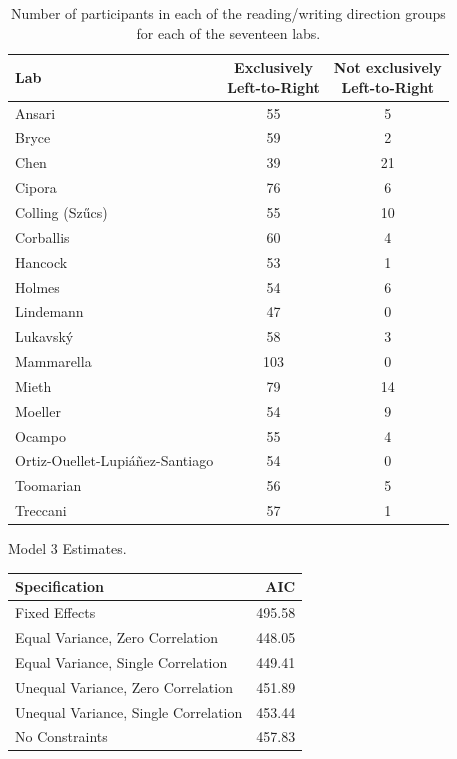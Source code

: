\documentclass[A4paper,man,floatsintext]{apa6}
\theoremstyle{definition}
\theoremstyle{definition}
\theoremstyle{definition}
\theoremstyle{remark}
\begin{document}
\begin{appendix}
\begin{table}

\caption{\label{tab:read}Number of participants in each of the reading/writing direction groups for each of the seventeen labs.}
\centering
\begin{tabular}[t]{lcc}
\toprule
Lab & \makecell[c]{Exclusively\\Left-to-Right} & \makecell[c]{Not exclusively\\Left-to-Right}\\
\midrule
Ansari & 55 & 5\\
Bryce & 59 & 2\\
Chen & 39 & 21\\
Cipora & 76 & 6\\
Colling (Szűcs) & 55 & 10\\
Corballis & 60 & 4\\
Hancock & 53 & 1\\
Holmes & 54 & 6\\
Lindemann & 47 & 0\\
Lukavský & 58 & 3\\
Mammarella & 103 & 0\\
Mieth & 79 & 14\\
Moeller & 54 & 9\\
Ocampo & 55 & 4\\
Ortiz-Ouellet-Lupiáñez-Santiago & 54 & 0\\
Toomarian & 56 & 5\\
Treccani & 57 & 1\\
\bottomrule
\end{tabular}
\end{table}

\begin{table}[!p]
\caption{\label{tab:mod3}Model 3 Estimates.}
\begin{subtable}{\textwidth}
\centering
\begin{table}[H]\centering\begingroup\fontsize{10}{12}\selectfont

\begin{tabular}{lr}
\toprule
Specification & AIC\\
\midrule
Fixed Effects & 495.58\\
Equal Variance, Zero Correlation & 448.05\\
Equal Variance, Single Correlation & 449.41\\
Unequal Variance, Zero Correlation & 451.89\\
Unequal Variance, Single Correlation & 453.44\\
No Constraints & 457.83\\
\bottomrule
\end{tabular}\endgroup{}
\end{table}
\end{subtable}
\begin{subtable}{\textwidth}
\caption{Fixed Effect Estimates}
\centering
\begin{table}[H]\centering\begingroup\fontsize{10}{12}\selectfont


\end{table}
\end{subtable}
\end{table}
\end{appendix}
\end{document}
